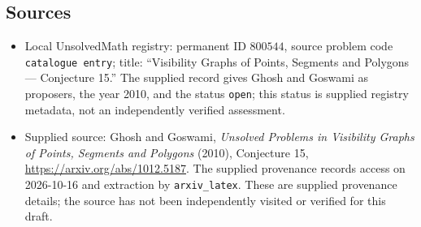 \documentclass[11pt]{article}
\begin{document}
\subsection{Sources}
\begin{itemize}
\item Local UnsolvedMath registry: permanent ID \(800544\), source problem code \texttt{catalogue entry}; title: ``Visibility Graphs of Points, Segments and Polygons --- Conjecture 15.'' The supplied record gives Ghosh and Goswami as proposers, the year 2010, and the status \texttt{open}; this status is supplied registry metadata, not an independently verified assessment.
\item Supplied source: Ghosh and Goswami, \emph{Unsolved Problems in Visibility Graphs of Points, Segments and Polygons} (2010), Conjecture 15, \url{https://arxiv.org/abs/1012.5187}. The supplied provenance records access on 2026-10-16 and extraction by \texttt{arxiv\_latex}. These are supplied provenance details; the source has not been independently visited or verified for this draft.
\end{itemize}
\end{document}
